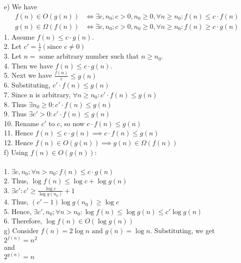 \documentclass[12pt]{report}
\newcommand{\no}{\noindent}
\begin{document}
	\no e) We have 
	\begin{align*}
	f(n) \in O(g(n)) &\iff \exists c, n_0;c > 0, n_0 \geq 0, \forall n \geq n_0: f(n) \leq c \cdot f(n)\\
	g(n) \in \Omega(f(n)) &\iff \exists c, n_0;c > 0, n_0 \geq 0, \forall n \geq n_0: f(n) \geq c \cdot g(n)
	\end{align*}
	1. Assume $f(n) \leq c \cdot g(n)$.\\
	2. Let $c' = \frac{1}{c} \left(\text{since } c \neq 0\right)$\\
	3. Let $n = \text{ some arbitrary number such that } n \geq n_0$.\\
	4. Then we have $f(n) \leq c \cdot g(n)$.\\
	5. Next we have $\frac{f(n)}{c} \leq g(n)$\\
	6. Substituting, $c' \cdot f(n) \leq g(n)$\\
	7. Since n is arbitrary, $\forall n \geq n_0: c' \cdot f(n) \leq g(n)$\\
	8. Thus $\exists n_0 \geq 0 : c' \cdot f(n) \leq g(n)$\\
	9. Thus $\exists c' >0 : c' \cdot f(n) \leq g(n)$\\
	10. Rename $c'$ to $c$, so now $c \cdot f(n) \leq g(n)$\\
	11. Hence $f(n) \leq c \cdot g(n) \implies c \cdot f(n) \leq g(n)$\\
	12. Hence $f(n) \in O(g(n)) \implies g(n) \in \Omega(f(n))$\\
	
	\no f) Using $f(n) \in O(g(n))$:\\
	\\
	1. $\exists c, n_0; \forall n > n_0 : f(n) \leq c \cdot g(n)$\\
	2. Thus, $\log{f(n)} \leq \log{c} + \log{g(n)}$\\
	3. $\exists c' : c' \geq \frac{\log{c}}{\log{g(n_0)}} + 1$\\
	4. Thus, $(c' - 1)\log{g(n_0)} \geq \log{c}$\\
	5. Hence, $\exists c', n_0; \forall n > n_0:\log{f(n)} \leq \log{g(n)} \leq c'\log{g(n)}$\\
	6. Therefore, $\log{f(n)} \in O(\log{g(n)})$\\
	
	\no g) Consider $f(n) = 2\log{n} \text{ and } g(n) = \log{n}$. Substituting, we get \\
	
	\centering
	$2^{f(n)} = n^2$\\
	and\\
	$2^{g(n)} = n$\\
	\justify
	
\end{document}
